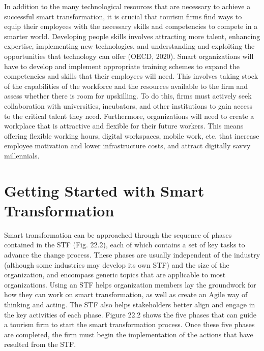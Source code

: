 \documentclass[
  letterpaper,
  DIV=11,
  numbers=noendperiod]{scrreprt}
\begin{document}
In addition to the many technological resources that are necessary to
achieve a successful smart transformation, it is crucial that tourism
firms find ways to equip their employees with the necessary skills and
competencies to compete in a smarter world. Developing people skills
involves attracting more talent, enhancing expertise, implementing new
technologies, and understanding and exploiting the opportunities that
technology can offer (OECD, 2020). Smart organizations will have to
develop and implement appropriate training schemes to expand the
competencies and skills that their employees will need. This involves
taking stock of the capabilities of the workforce and the resources
available to the firm and assess whether there is room for upskilling.
To do this, firms must actively seek collaboration with universities,
incubators, and other institutions to gain access to the critical talent
they need. Furthermore, organizations will need to create a workplace
that is attractive and flexible for their future workers. This means
offering flexible working hours, digital workspaces, mobile work, etc.
that increase employee motivation and lower infrastructure costs, and
attract digitally savvy millennials.

\hypertarget{getting-started-with-smart-transformation}{%
\section{Getting Started with Smart
Transformation}\label{getting-started-with-smart-transformation}}

Smart transformation can be approached through the sequence of phases
contained in the STF (Fig. 22.2), each of which contains a set of key
tasks to advance the change process. These phases are usually
independent of the industry (although some industries may develop its
own STF) and the size of the organization, and encompass generic topics
that are applicable to most organizations. Using an STF helps
organization members lay the groundwork for how they can work on smart
transformation, as well as create an Agile way of thinking and acting.
The STF also helps stakeholders better align and engage in the key
activities of each phase. Figure 22.2 shows the five phases that can
guide a tourism firm to start the smart transformation process. Once
these five phases are completed, the firm must begin the implementation
of the actions that have resulted from the STF.
\end{document}
